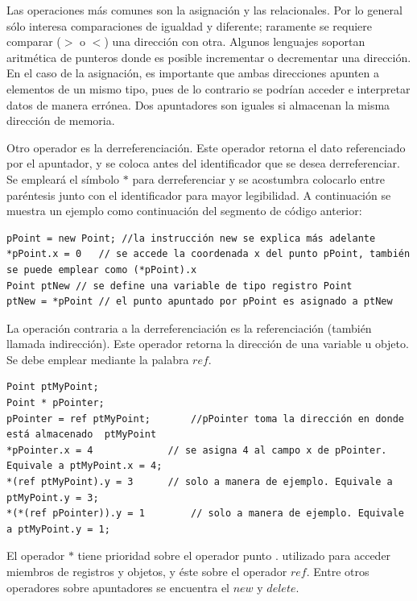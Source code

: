 Las operaciones más comunes son la asignación y las relacionales. Por lo general sólo interesa comparaciones de igualdad y diferente; raramente se requiere comparar ($>$ o $<$) una dirección con otra. Algunos lenguajes soportan aritmética de punteros donde es posible incrementar o decrementar una dirección. En el caso de la asignación, es importante que ambas direcciones apunten a elementos de un mismo tipo, pues de lo contrario se podrían acceder e interpretar datos de manera errónea. Dos apuntadores son iguales si almacenan la misma dirección de memoria.

Otro operador es la derreferenciación. Este operador retorna el dato referenciado por el apuntador, y se coloca antes del identificador que se desea derreferenciar. Se empleará el símbolo $*$ para derreferenciar y se acostumbra colocarlo entre paréntesis junto con el identificador para mayor legibilidad. A continuación se muestra un ejemplo como continuación del segmento de código anterior:

\begin{lstlisting}[upquote=true, language=pseudo]
pPoint = new Point; //la instrucción new se explica más adelante
*pPoint.x = 0	// se accede la coordenada x del punto pPoint, también se puede emplear como (*pPoint).x
Point ptNew	// se define una variable de tipo registro Point
ptNew = *pPoint	// el punto apuntado por pPoint es asignado a ptNew
\end{lstlisting}

La operación contraria a la derreferenciación es la referenciación (también llamada indirección). Este operador retorna la dirección de una variable u objeto. Se debe emplear mediante la palabra $ref$.

\begin{lstlisting}[upquote=true, language=pseudo]
Point ptMyPoint;
Point * pPointer;
pPointer = ref ptMyPoint;		//pPointer toma la dirección en donde está almacenado  ptMyPoint
*pPointer.x = 4				// se asigna 4 al campo x de pPointer. Equivale a ptMyPoint.x = 4;
*(ref ptMyPoint).y = 3		// solo a manera de ejemplo. Equivale a ptMyPoint.y = 3;
*(*(ref pPointer)).y = 1		// solo a manera de ejemplo. Equivale a ptMyPoint.y = 1;
\end{lstlisting}

El operador $*$ tiene prioridad sobre el operador punto $.$ utilizado para acceder miembros de registros y objetos, y éste sobre el operador $ref$. Entre otros operadores sobre apuntadores se encuentra el $new$ y $delete$.

